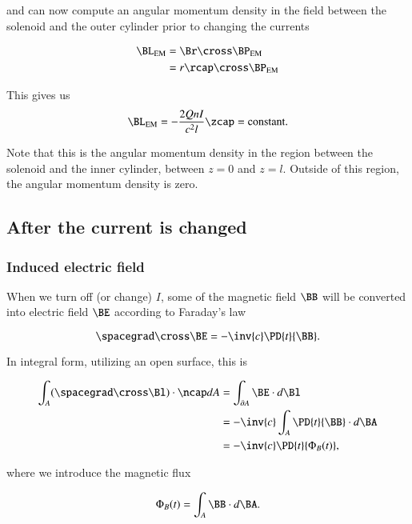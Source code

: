 and can now compute an angular momentum density in the field between the solenoid and the outer cylinder prior to changing the currents

\begin{align*}
\BL_{\text{EM}}
&= \Br \cross \BP_{\text{EM}} \\
&= r \rcap \cross \BP_{\text{EM}} \\
\end{align*}

This gives us
\begin{equation}\label{eqn:relativisticElectrodynamicsT5:271}
\BL_{\text{EM}} = -\frac{2 Q n I}{c^2 l} \zcap = \text{constant}.
\end{equation}

Note that this is the angular momentum density in the region between the solenoid and the inner cylinder, between $z = 0$ and $z = l$.  Outside of this region, the angular momentum density is zero.

\subsection{After the current is changed}
\subsubsection{Induced electric field}

When we turn off (or change) $I$, some of the magnetic field $\BB$ will be converted into electric field $\BE$ according to Faraday's law

\begin{equation}\label{eqn:relativisticElectrodynamicsT5:290}
\spacegrad \cross \BE = - \inv{c} \PD{t}{\BB}.
\end{equation}

In integral form, utilizing an open surface, this is

\begin{align*}
\int_A (\spacegrad \cross \Bl) \cdot \ncap dA
&=
\int_{\partial A} \BE \cdot d\Bl \\
&= - \inv{c} \int_A \PD{t}{\BB} \cdot d\BA \\
&= - \inv{c} \PD{t}{\Phi_B(t)},
\end{align*}

where we introduce the magnetic flux

\begin{equation}\label{eqn:relativisticElectrodynamicsT5:291}
\Phi_B(t) = \int_A \BB \cdot d\BA.
\end{equation}

